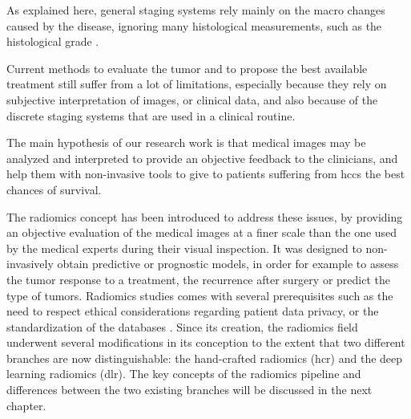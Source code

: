 As explained here, general staging systems rely mainly on the macro
changes caused by the disease, ignoring many histological measurements,
such as the histological grade \cite{EdmondsonHA1954}.


Current methods to evaluate the tumor and to propose the best available
treatment still suffer from a lot of limitations, especially because
they rely on subjective interpretation of images, or clinical data, and
also because of the discrete staging systems that are used in a clinical
routine.

The main hypothesis of our research work is that medical images may be analyzed and interpreted to provide an objective feedback to the clinicians, and help
them with non-invasive tools to give to patients suffering from
\ac{hcc}s the best chances of survival.

The radiomics concept has been introduced to address these issues, by providing an objective evaluation of the medical images at a finer scale than the one used by the medical experts during their visual inspection. 
It was designed to non-invasively obtain predictive or prognostic models, in order for example to assess the tumor response to a treatment, the recurrence after surgery or predict the type of tumors.
Radiomics studies comes with several prerequisites such as the need to respect ethical considerations regarding patient data privacy, or the standardization of the databases \cite{Tang2018}.
Since its creation, the radiomics field underwent several modifications in its conception to the extent that two different branches are now distinguishable: the hand-crafted radiomics (\ac{hcr}) and the deep learning radiomics (\ac{dlr}).
The key concepts of the radiomics pipeline and differences between the two existing branches will be discussed in the next chapter.



